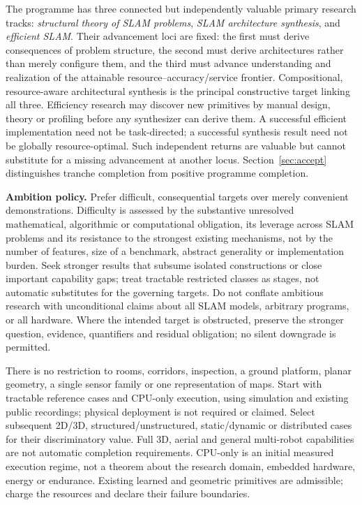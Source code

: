 \documentclass[11pt,letterpaper]{article}
\begin{document}
The programme has three connected but independently valuable primary research tracks: \emph{structural theory of SLAM problems}, \emph{SLAM architecture synthesis}, and \emph{efficient SLAM}. Their advancement loci are fixed: the first must derive consequences of problem structure, the second must derive architectures rather than merely configure them, and the third must advance understanding and realization of the attainable resource--accuracy/service frontier. Compositional, resource-aware architectural synthesis is the principal constructive target linking all three. Efficiency research may discover new primitives by manual design, theory or profiling before any synthesizer can derive them. A successful efficient implementation need not be task-directed; a successful synthesis result need not be globally resource-optimal. Such independent returns are valuable but cannot substitute for a missing advancement at another locus. Section~\ref{sec:accept} distinguishes tranche completion from positive programme completion.

\textbf{Ambition policy.} Prefer difficult, consequential targets over merely convenient demonstrations. Difficulty is assessed by the substantive unresolved mathematical, algorithmic or computational obligation, its leverage across SLAM problems and its resistance to the strongest existing mechanisms, not by the number of features, size of a benchmark, abstract generality or implementation burden. Seek stronger results that subsume isolated constructions or close important capability gaps; treat tractable restricted classes as stages, not automatic substitutes for the governing targets. Do not conflate ambitious research with unconditional claims about all SLAM models, arbitrary programs, or all hardware. Where the intended target is obstructed, preserve the stronger question, evidence, quantifiers and residual obligation; no silent downgrade is permitted.

There is no restriction to rooms, corridors, inspection, a ground platform, planar geometry, a single sensor family or one representation of maps. Start with tractable reference cases and CPU-only execution, using simulation and existing public recordings; physical deployment is not required or claimed. Select subsequent 2D/3D, structured/unstructured, static/dynamic or distributed cases for their discriminatory value. Full 3D, aerial and general multi-robot capabilities are not automatic completion requirements. CPU-only is an initial measured execution regime, not a theorem about the research domain, embedded hardware, energy or endurance. Existing learned and geometric primitives are admissible; charge the resources and declare their failure boundaries.
\end{document}
